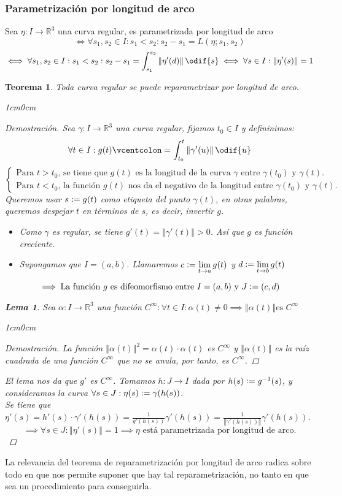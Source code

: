 \documentclass[12pt]{article}
\theoremstyle{plain}
\newtheorem{teo}{Teorema}[subsection]
\newtheorem{lem}{Lema}[subsection]
\newenvironment{dem}[1][]{%
	\begin{adjustwidth}{1cm}{0cm} \begin{proof}[Demostración\ifx\relax#1\relax\else{ (#1)}\fi]
}{\end{proof}\end{adjustwidth}}
\newcommand{\R}{\mathbb{R}}
\newcommand{\norm}[1]{\left\Vert#1\right\Vert}
\newcommand{\appl}[3]{#1 \colon #2 \longrightarrow #3}
\newcommand{\ds}{\displaystyle}
\newcommand{\tex}[1]{\text{#1}}
\newcommand{\defeq}{\vcentcolon=}
\renewcommand{\norm}[1]{\left\Vert#1\right\Vert}
\begin{document}
\subsubsection{Parametrización por longitud de arco}
\begin{defn}
	Sea $\appl{\eta}{I}{\R^3}$ una curva regular, es parametrizada por longitud de arco
	\[\iff \forall s_1, s_2 \in I : s_1<s_2 : s_2-s_1=L(\eta; s_1, s_2)\]
	\[\iff \forall s_1, s_2 \in I : s_1<s_2 : s_2-s_1=\int_{s_1}^{s_2}\norm{\eta'(d)}\odif{s} \iff \forall s \in I : \norm{\eta'(s)}=1\]
\end{defn}
\begin{teo}
	Toda curva regular se puede reparametrizar por longitud de arco.
	\begin{dem}
		Sea $\appl{\gamma}{I}{\R^3}$ una curva regular, fijamos $t_0\in I$ y defininimos: \[\forall t \in I : g(t)\defeq\int_{t_0}^t\norm{\gamma'(u)}\odif{u}\]
		\[\begin{cases}
			\tex{Para } t >t_0\tex{, se tiene que } g(t) \tex{ es la longitud de la curva } \gamma \tex{ entre } \gamma(t_0) \tex{ y } \gamma(t).\\
			\tex{Para } t <t_0\tex{, la función } g(t) \tex{ nos da el negativo de la longitud entre } \gamma(t_0) \tex{ y } \gamma(t).
		\end{cases}\]
		Queremos usar $s \defeq g(t)$ como etiqueta del punto $\gamma(t)$, en otras palabras, queremos despejar $t$ en términos de $s$, es decir, invertir $g$.
		\begin{itemize}
			\item Como $\gamma$ es regular, se tiene $g'(t)=\norm{\gamma'(t)}>0$. Así que $g$ es función creciente.
			\item Supongamos que $I=(a,b)$. Llamaremos $\ds c\defeq \lim_{t \rightarrow a}g(t)$ y $\ds d\defeq \lim_{t \rightarrow b}g(t)$ 
		\end{itemize}
		\[\implies \tex{La función $g$ es difeomorfismo entre $I=(a,b)$ y $J\defeq(c,d)$}\]
		\begin{lem}
			Sea $\appl{\alpha}{I}{\R^3}$ una función $C^\infty : \forall t\in I : \alpha(t)\ne 0 \implies \norm{\alpha(t)} \tex{es }C^\infty$
			\begin{dem}
				La función $\norm{\alpha(t)}^2=\alpha(t)\cdot\alpha(t)$ es $C^\infty$ y $\norm{\alpha(t)}$ es la raíz cuadrada de una función $C^\infty$ que no se anula, por tanto, es $C^\infty$.
			\end{dem}
		\end{lem}
		El lema nos da que $g'$ es $C^\infty$.
		Tomamos $\appl{h}{J}{I}$ dada por $h(s)\defeq g^{-1}(s)$, y consideramos la curva $\forall s \in J : \eta(s)\defeq\gamma(h(s))$. \\
		Se tiene que $\ds \eta'(s)=h'(s)\cdot\gamma'(h(s))=\frac{1}{g'(h(s))}\gamma'(h(s))=\frac{1}{\norm{\gamma'(h(s))}}\gamma'(h(s))$.
		\[\implies \forall s \in J : \norm{\eta'(s)}=1\implies \eta\tex{ está parametrizada por longitud de arco.}\]
	\end{dem}
\end{teo}
La relevancia del teorema de reparametrización por longitud de arco radica sobre todo en que nos permite suponer que hay tal reparametrización, no tanto en que sea un procedimiento para conseguirla.
\end{document}
